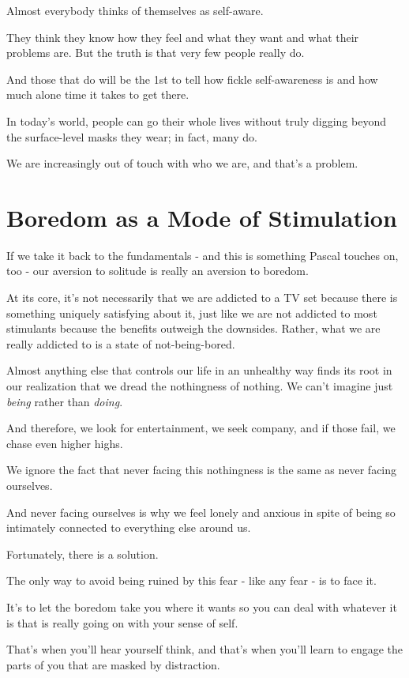 \documentclass{book}
\numberwithin{equation}{section}
\begin{document}
%
Almost everybody thinks of themselves as self-aware.

They think they know how they feel and what they want and what their problems are. But the truth is that very few people really do.

And those that do will be the 1st to tell how fickle self-awareness is and how much alone time it takes to get there.

%
In today's world, people can go their whole lives without truly digging beyond the surface-level masks they wear; in fact, many do.

%
We are increasingly out of touch with who we are, and that's a problem.

\section{Boredom as a Mode of Stimulation}
If we take it back to the fundamentals - and this is something Pascal touches on, too - our aversion to solitude is really an aversion to boredom.

%
At its core, it's not necessarily that we are addicted to a TV set because there is something uniquely satisfying about it, just like we are not addicted to most stimulants because the benefits outweigh the downsides. Rather, what we are really addicted to is a state of not-being-bored.

%
Almost anything else that controls our life in an unhealthy way finds its root in our realization that we dread the nothingness of nothing. We can't imagine just \textit{being} rather than \textit{doing}.

And therefore, we look for entertainment, we seek company, and if those fail, we chase even higher highs.

%
We ignore the fact that never facing this nothingness is the same as never facing ourselves.

And never facing ourselves is why we feel lonely and anxious in spite of being so intimately connected to everything else around us.

%
Fortunately, there is a solution.

The only way to avoid being ruined by this fear - like any fear - is to face it.

It's to let the boredom take you where it wants so you can deal with whatever it is that is really going on with your sense of self.

That's when you'll hear yourself think, and that's when you'll learn to engage the parts of you that are masked by distraction.
\end{document}
